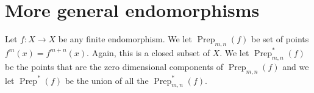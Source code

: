 \documentclass{amsart}
\newcommand{\lra}{\longrightarrow}
\DeclareMathOperator{\Prep}{Prep}
\DeclareMathOperator{\Per}{Per}
\newcommand{\fo}{\mathfrak o}
\newcommand{\cX}{\mathcal X}
\newtheorem{lem}[thm]{Lemma}
\newtheorem{cor}[thm]{Corollary}
\theoremstyle{definition}
\begin{document}







\section{More general endomorphisms}\label{north-sec}





Let $f: X \lra X$ be any finite endomorphism.  We let $\Prep_{m,n}(f)$
be set of points $f^m(x) = f^{m+n}(x)$.  Again, this is a closed
subset of $X$.  We let $\Prep^*_{m,n}(f)$ be the points that are the
zero dimensional components of $\Prep_{m,n}(f)$ and we let
$\Prep^*(f)$ be the union of all the $\Prep^*_{m,n}(f)$.
\end{document}
